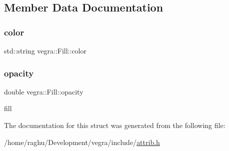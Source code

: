 \subsection{Member Data Documentation}
\mbox{\label{structvegra_1_1Fill_a04e027e6c024853598f4f1f9750a18f5}} 
\subsubsection{\texorpdfstring{color}{color}}
{\footnotesize\ttfamily std\+::string vegra\+::\+Fill\+::color}

\mbox{\label{structvegra_1_1Fill_a19afcc63bea86ccbb0eb425ca8ba3648}} 
\subsubsection{\texorpdfstring{opacity}{opacity}}
{\footnotesize\ttfamily double vegra\+::\+Fill\+::opacity}



fill 



The documentation for this struct was generated from the following file\+:\begin{DoxyCompactItemize}
\item 
/home/raghu/\+Development/vegra/include/\mbox{\hyperlink{attrib_8h}{attrib.\+h}}\end{DoxyCompactItemize}
